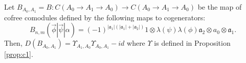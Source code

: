 %
\begin{prop}
\label{prop:c2}
Let 
$B_{A_0,A_1} = B:C(A_0 \to A_1 \to A_0)
\longrightarrow C(A_0 \to A_1 \to A_0)$ 
be the map of cofree comodules defined by 
the following maps to cogenerators:
\begin{equation}
\label{eq:def_sigma}
B_{n, m} (\vec{\phi} | \vec{\psi} | \alpha) 
= (-1)^{|\mathfrak{a}_1|(|\mathfrak{a}_1|+|\mathfrak{a}_2|)}
1 \otimes \lambda(\psi)\lambda(\phi) \mathfrak{a}_2 \otimes a_0 \otimes \mathfrak{a}_1.
\end{equation}
Then, $D(B_{A_0,A_1}) = \Upsilon_{A_1,A_0}\Upsilon_{A_0,A_1} - id$ where
$\Upsilon$ is defined in Proposition 
\ref{prop:c1}.
\end{prop}
%
